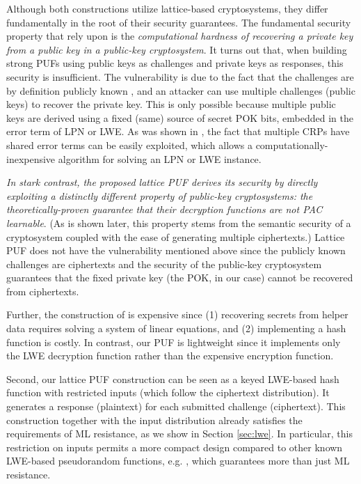 Although both constructions utilize lattice-based cryptosystems, they differ fundamentally in the root of their security guarantees.
The fundamental security property that \cite{fuller2013computational} rely upon is the \emph{computational hardness of recovering a private key from a public key in a public-key cryptosystem}. 
It turns out that, when building strong PUFs using public keys as challenges and private keys as responses, this security is insufficient. 
The vulnerability is due to the fact that the challenges are by definition publicly known \cite{fuller2013computational,herder2017trapdoor,jin2017fpga}, and an attacker can use multiple challenges (public keys) to recover the private key. 
This is only possible because multiple public keys are derived using a fixed (same) source of secret POK bits, embedded in the error term of LPN or LWE. 
As was shown in \cite{apon2017efficient}, the fact that multiple CRPs have shared error terms can be easily exploited, which allows a computationally-inexpensive algorithm for solving an LPN or LWE instance. 

\emph{In stark contrast, the proposed lattice PUF derives its security by directly exploiting a distinctly different property of public-key cryptosystems: the theoretically-proven guarantee that their decryption functions are not PAC learnable}. 
(As is shown later, this property stems from the semantic security of a cryptosystem coupled with the ease of generating multiple ciphertexts.) 
Lattice PUF does not have the vulnerability mentioned above since the publicly known challenges are ciphertexts and the security of the public-key cryptosystem guarantees that the fixed private key (the POK, in our case) cannot be recovered from ciphertexts.

Further, the construction of  \cite{herder2017trapdoor,jin2017fpga} is expensive since (1) recovering secrets from helper data requires solving a system of linear equations, and (2) implementing a hash function is costly.  
In contrast, our PUF is lightweight since it implements only the LWE decryption function rather than the expensive encryption function.

Second, our lattice PUF construction can be seen as a keyed LWE-based hash function with restricted inputs (which follow the ciphertext distribution). 
It generates a response (plaintext) for each submitted challenge (ciphertext). 
This construction together with the input distribution already satisfies the requirements of ML resistance, as we show in Section \ref{sec:lwe}.
In particular, this restriction on inputs permits a more compact design compared to other known LWE-based pseudorandom functions, e.g. \cite{brenner2014fpga}, which guarantees more than just ML resistance. 

